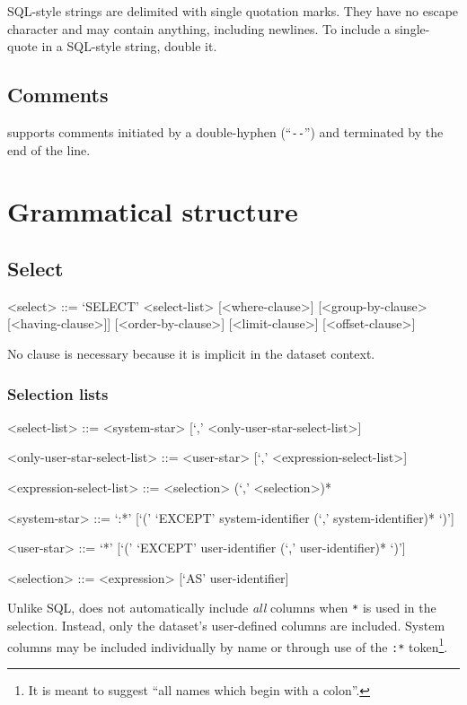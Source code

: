 \documentclass{article}
\begin{document}
SQL-style strings are delimited with single quotation marks.  They
have no escape character and may contain anything, including newlines.
To include a single-quote in a SQL-style string, double it.

\subsection{Comments}

\SoQL{} supports comments initiated by a double-hyphen
(``\lstinline|--|'') and terminated by the end of the line.

\section{Grammatical structure}

\subsection{Select}
\begin{grammar}
<select> ::= `SELECT' <select-list> [<where-clause>] [<group-by-clause> [<having-clause>]] [<order-by-clause>] [<limit-clause>] [<offset-clause>]
\end{grammar}

No  clause is necessary because it is implicit in the
dataset context.

\subsubsection{Selection lists}
\begin{grammar}
<select-list> ::= <system-star> [`,' <only-user-star-select-list>]

<only-user-star-select-list> ::= <user-star> [`,' <expression-select-list>]

<expression-select-list> ::= <selection> (`,' <selection>)*

<system-star> ::= `:*' [`(' `EXCEPT' system-identifier (`,' system-identifier)* `)']

<user-star> ::= `*' [`(' `EXCEPT' user-identifier (`,' user-identifier)* `)']

<selection> ::= <expression> [`AS' user-identifier]
\end{grammar}

Unlike SQL, \SoQL{} does not automatically include \emph{all} columns
when \lstinline|*| is used in the selection.  Instead, only the
dataset's user-defined columns are included.  System columns may be
included individually by name or through use of the \lstinline|:*|
token\footnote{It is meant to suggest ``all names which begin with a
  colon''.}.
\end{document}
